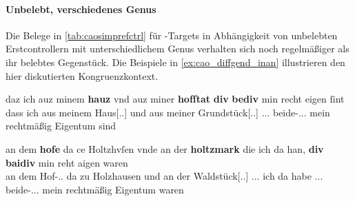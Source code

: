 %

\paragraph{Unbelebt, verschiedenes Genus}

Die Belege in \cref{tab:caosimprefctrl} für -Targets in
Abhängigkeit von unbelebten Erstcontrollern mit unterschiedlichem Genus
verhalten sich noch regelmäßiger als ihr belebtes Gegenstück. Die Beispiele in
\cref{ex:cao_diffgend_inan} illustrieren den hier diskutierten
Kongruenzkontext.

\begin{exe}
\ex \label{ex:cao_diffgend_inan}
	\begin{xlist}
	\ex \label{ex:cao_diffgend_inan_1}
		\gll daz ich auz minem \textbf{hauz} vnd auz miner \textbf{hofſtat}
			\textbf{div} \textbf{bediv} min recht eigen ſint \\
			dass ich aus meinem Haus[\Dat.\Sg.\NeutI] und aus meiner
			Grundstück[\Dat.\Sg.\FemI] \Rel.\Nom.\Pl.\NeutI{}
			beide-\Nom.\Pl.\NeutI.\St{} mein rechtmäßig Eigentum sind \\
		\begin{taggedline}{\parencites(Regensburg, 1290)[\pno~1282, 526.37--38]{cao2}}
		\trans {}
		\end{taggedline}

	\ex \label{ex:cao_diffgend_inan_2}
		\gll an dem \textbf{hofe} da ce Holtzhvſen \textelp{} vnde an der
			\textbf{holtzmark} die ich da han, \textbf{div} \textbf{baidiv} min
			reht aigen waren \\
			an dem Hof-\Dat.\Sg.\MascI{} da zu Holzhausen {} und an der
			Waldstück[\Dat.\Sg.\FemI] \Rel.\Nom.\Sg.\FemI{} ich da habe
			\Rel.\Nom.\Pl.\NeutI{} beide-\Nom.\Pl.\NeutI.\St{} mein
			rechtmäßig Eigentum waren \\
		\begin{taggedline}{\parencites(Augsburg, 1285)[\pno~N~272, 215.30--31]{cao5}}
		\trans {}
		\end{taggedline}
	\end{xlist}
\end{exe}

